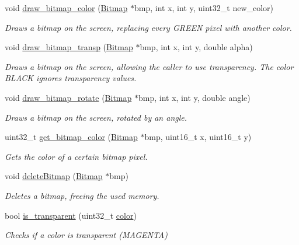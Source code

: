 \begin{DoxyCompactItemize}
void \mbox{\hyperlink{group__bitmap_ga0a2714359072f1a1b3f361c89e30be52}{draw\+\_\+bitmap\+\_\+color}} (\mbox{\hyperlink{struct_bitmap}{Bitmap}} $\ast$bmp, int x, int y, uint32\+\_\+t new\+\_\+color)
\begin{DoxyCompactList}\small\item\em Draws a bitmap on the screen, replacing every G\+R\+E\+EN pixel with another color. \end{DoxyCompactList}\item 
void \mbox{\hyperlink{group__bitmap_ga12d1b6c1fa206ba89cf45d23f6679657}{draw\+\_\+bitmap\+\_\+transp}} (\mbox{\hyperlink{struct_bitmap}{Bitmap}} $\ast$bmp, int x, int y, double alpha)
\begin{DoxyCompactList}\small\item\em Draws a bitmap on the screen, allowing the caller to use transparency. The color B\+L\+A\+CK ignores transparency values. \end{DoxyCompactList}\item 
void \mbox{\hyperlink{group__bitmap_ga3c405395b542105657c9811e99c56da4}{draw\+\_\+bitmap\+\_\+rotate}} (\mbox{\hyperlink{struct_bitmap}{Bitmap}} $\ast$bmp, int x, int y, double angle)
\begin{DoxyCompactList}\small\item\em Draws a bitmap on the screen, rotated by an angle. \end{DoxyCompactList}\item 
uint32\+\_\+t \mbox{\hyperlink{group__bitmap_gad73cdf3b48e5ca2e43ef1fbdd5b061b9}{get\+\_\+bitmap\+\_\+color}} (\mbox{\hyperlink{struct_bitmap}{Bitmap}} $\ast$bmp, uint16\+\_\+t x, uint16\+\_\+t y)
\begin{DoxyCompactList}\small\item\em Gets the color of a certain bitmap pixel. \end{DoxyCompactList}\item 
void \mbox{\hyperlink{group__bitmap_ga08c1d4f4fff81df260d979ea8fc1aa61}{delete\+Bitmap}} (\mbox{\hyperlink{struct_bitmap}{Bitmap}} $\ast$bmp)
\begin{DoxyCompactList}\small\item\em Deletes a bitmap, freeing the used memory. \end{DoxyCompactList}\item 
bool \mbox{\hyperlink{group__bitmap_ga4b5b3aefecdb54bfdadbe4995b979c7f}{is\+\_\+transparent}} (uint32\+\_\+t \mbox{\hyperlink{structcolor}{color}})
\begin{DoxyCompactList}\small\item\em Checks if a color is transparent (M\+A\+G\+E\+N\+TA) \end{DoxyCompactList}\end{DoxyCompactItemize}
